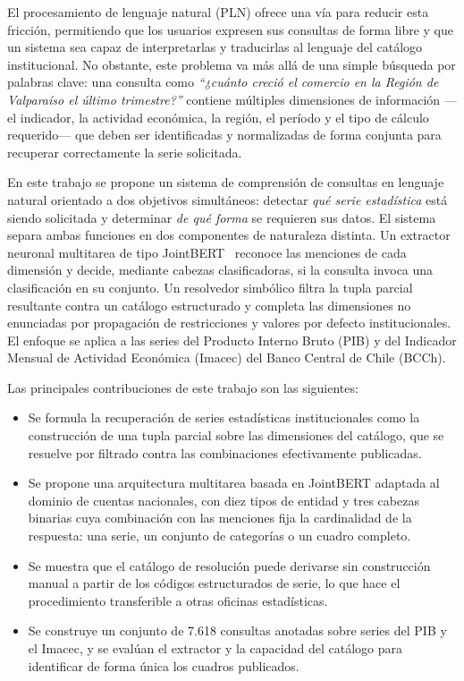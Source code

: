 \documentclass[11pt]{article}
\begin{document}
El procesamiento de lenguaje natural (PLN) ofrece una vía para reducir esta
fricción, permitiendo que los usuarios expresen sus consultas de forma libre y que
un sistema sea capaz de interpretarlas y traducirlas al lenguaje del catálogo
institucional. No obstante, este problema va más allá de una simple búsqueda por
palabras clave: una consulta como \textit{``¿cuánto creció el comercio en la Región
de Valparaíso el último trimestre?''} contiene múltiples dimensiones de información
---el indicador, la actividad económica, la región, el período y el tipo de cálculo
requerido--- que deben ser identificadas y normalizadas de forma conjunta para
recuperar correctamente la serie solicitada.

En este trabajo se propone un sistema de comprensión de consultas en lenguaje
natural orientado a dos objetivos simultáneos: detectar \textit{qué serie
estadística} está siendo solicitada y determinar \textit{de qué forma} se requieren
sus datos. El sistema separa ambas funciones en dos componentes de naturaleza
distinta. Un extractor neuronal multitarea de tipo JointBERT~\citep{chen2019bert}
reconoce las menciones de cada dimensión y decide, mediante cabezas
clasificadoras, si la consulta invoca una clasificación en su conjunto. Un
resolvedor simbólico filtra la tupla parcial resultante contra un catálogo
estructurado y completa las dimensiones no enunciadas por propagación de
restricciones y valores por defecto institucionales. El enfoque se aplica a las
series del Producto Interno Bruto (PIB) y del Indicador Mensual de Actividad
Económica (Imacec) del Banco Central de Chile (BCCh).

Las principales contribuciones de este trabajo son las siguientes:

\begin{itemize}
    \item Se formula la recuperación de series estadísticas institucionales como
    la construcción de una tupla parcial sobre las dimensiones del catálogo, que
    se resuelve por filtrado contra las combinaciones efectivamente publicadas.

    \item Se propone una arquitectura multitarea basada en JointBERT adaptada al
    dominio de cuentas nacionales, con diez tipos de entidad y tres cabezas
    binarias cuya combinación con las menciones fija la cardinalidad de la
    respuesta: una serie, un conjunto de categorías o un cuadro completo.

    \item Se muestra que el catálogo de resolución puede derivarse sin
    construcción manual a partir de los códigos estructurados de serie, lo que
    hace el procedimiento transferible a otras oficinas estadísticas.

    \item Se construye un conjunto de 7.618 consultas anotadas sobre series del
    PIB y el Imacec, y se evalúan el extractor y la capacidad del catálogo para
    identificar de forma única los cuadros publicados.
\end{itemize}
\end{document}

